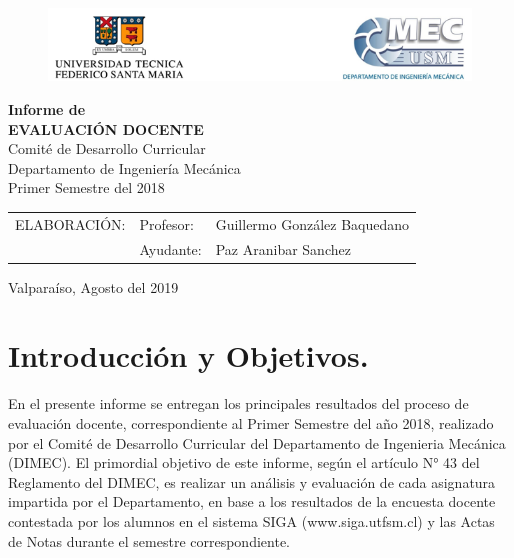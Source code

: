 \documentclass[12pt]{article}
\begin{document}
\begin{titlepage}
\begin{figure}
    \centering
    \includegraphics[width=1\textwidth]{logo.png}
\end{figure}

\begin{center}
\vspace*{3cm}
\color{gray}
{\Huge \textbf{Informe de}}\\[0.2cm]
{\Huge \textbf{EVALUACIÓN DOCENTE}}\\[0.2cm]
\color{black}
{\Large{Comité de Desarrollo Curricular}}\\[0.2cm]
{\Large Departamento de Ingeniería Mecánica}\\[0.2cm]
{\Large Primer Semestre del 2018}\\[2.5cm]

\begin{table}[H]
\centering
\begin{tabular}{lll}
{\large ELABORACIÓN: } & {\large Profesor:} & {\large Guillermo González Baquedano} \\
 & {\large Ayudante:} & {\large Paz Aranibar Sanchez}
\end{tabular}
\end{table}

\vspace{2cm}
Valparaíso, Agosto del 2019
\end{center}
\end{titlepage}

\newpage
\tableofcontents

\newpage



\section{Introducción y Objetivos.}
\begin{text}
En el presente informe se entregan los principales resultados del proceso de evaluación docente, correspondiente al Primer Semestre del año 2018, realizado por el Comité de Desarrollo Curricular del Departamento de Ingenieria Mecánica (DIMEC). El primordial objetivo de este informe, según el artículo N° 43 del Reglamento del DIMEC, es realizar un análisis y evaluación de cada asignatura impartida por el Departamento, en base a los resultados de la encuesta docente contestada por los alumnos en el sistema SIGA (www.siga.utfsm.cl) y las Actas de Notas durante el semestre correspondiente.
\end{text}
\end{document}
